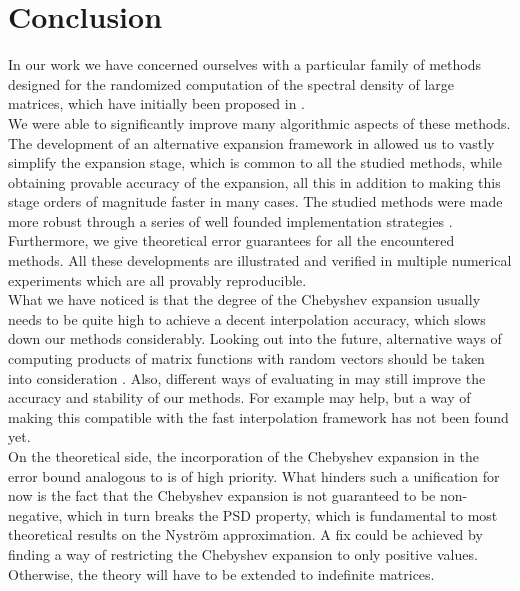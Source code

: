 \chapter{Conclusion}
\label{chp:6-conclusion}

In our work we have concerned ourselves with a particular family of methods
designed for the randomized computation of the spectral density of large matrices,
which have initially been proposed in \cite{lin2017randomized}.\\

We were able to
significantly improve many algorithmic aspects of these methods. The development
of an alternative expansion framework in 
allowed us to vastly simplify the expansion stage, which is common to all the
studied methods, while obtaining provable accuracy of the expansion, all this in
addition to making this stage orders of magnitude faster in many cases. 
The studied methods were made more robust through a series of well founded
implementation strategies .
Furthermore, we give theoretical error guarantees for all the encountered methods.
All these developments are illustrated and verified in multiple numerical experiments
which are all provably reproducible.\\

What we have noticed is that the degree of the Chebyshev expansion usually needs
to be quite high to achieve a decent interpolation accuracy, which slows down
our methods considerably. Looking out into the future, alternative ways of
computing products of matrix functions with random vectors should be taken into
consideration \cite{cortinovis2023speeding,ubaru2017lanczos}. Also, different ways
of evaluating  in 
may still improve the accuracy and stability of our methods. For example
\cite[algorithm~5.6]{tropp2023randomized} may help, but a way of making this
compatible with the fast interpolation framework has not been found yet.\\

On the theoretical side, the incorporation of the Chebyshev expansion in the
error bound analogous to  is of high priority.
What hinders such a unification for now is the fact that the Chebyshev expansion
is not guaranteed to be non-negative, which in turn breaks the \gls{PSD} property,
which is fundamental to most theoretical results on the Nystr\"om approximation.
A fix could be achieved by finding a way of restricting the Chebyshev expansion
to only positive values. Otherwise, the theory will have to be extended to
indefinite matrices.
